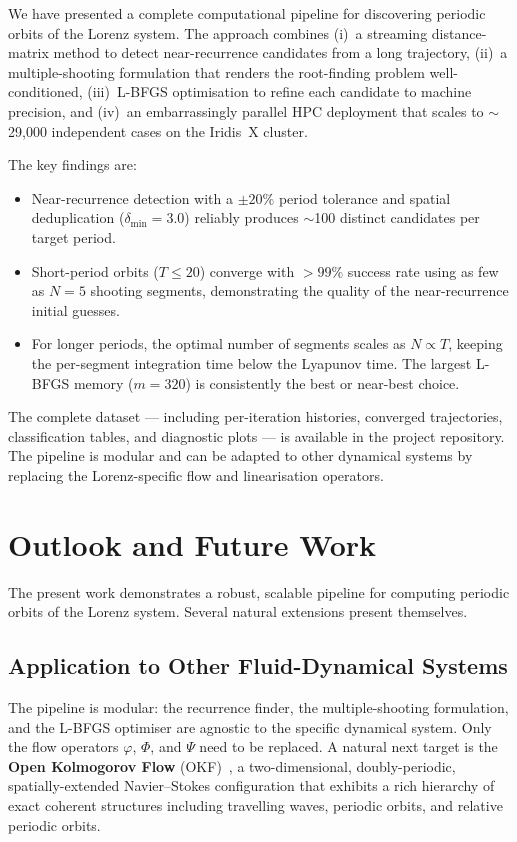 \documentclass[11pt,a4paper]{article}
\begin{document}
We have presented a complete computational pipeline for discovering periodic
orbits of the Lorenz system.  The approach combines (i)~a streaming
distance-matrix method to detect near-recurrence candidates from a long
trajectory, (ii)~a multiple-shooting formulation that renders the
root-finding problem well-conditioned, (iii)~L-BFGS optimisation to refine
each candidate to machine precision, and (iv)~an embarrassingly parallel HPC
deployment that scales to $\sim$29,000 independent cases on the Iridis~X
cluster.

The key findings are:

\begin{itemize}
  \item Near-recurrence detection with a $\pm 20\%$ period tolerance and
        spatial deduplication ($\delta_{\min} = 3.0$) reliably produces
        $\sim$100 distinct candidates per target period.

  \item Short-period orbits ($T \le 20$) converge with $>\!99\%$ success
        rate using as few as $N = 5$ shooting segments, demonstrating the
        quality of the near-recurrence initial guesses.

  \item For longer periods, the optimal number of segments scales as
        $N \propto T$, keeping the per-segment integration time below the
        Lyapunov time.  The largest L-BFGS memory ($m = 320$) is
        consistently the best or near-best choice.
\end{itemize}

The complete dataset --- including per-iteration histories, converged
trajectories, classification tables, and diagnostic plots --- is available
in the project repository.  The pipeline is modular and can be adapted to
other dynamical systems by replacing the Lorenz-specific flow and
linearisation operators.

\section{Outlook and Future Work}

The present work demonstrates a robust, scalable pipeline for computing
periodic orbits of the Lorenz system.  Several natural extensions present
themselves.

\subsection{Application to Other Fluid-Dynamical Systems}
The pipeline is modular: the recurrence finder, the multiple-shooting
formulation, and the L-BFGS optimiser are agnostic to the specific dynamical
system.  Only the flow operators $\varphi$, $\Phi$, and $\Psi$ need to be
replaced.  A natural next target is the \textbf{Open Kolmogorov Flow}
(OKF)~\cite{chandler2022open}, a two-dimensional, doubly-periodic,
spatially-extended Navier--Stokes configuration that exhibits a rich
hierarchy of exact coherent structures including travelling waves, periodic
orbits, and relative periodic orbits.
\end{document}
